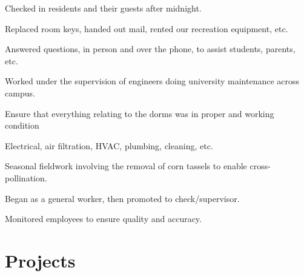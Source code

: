 \documentclass[]{latex/resume}
\begin{document}
\begin{minipage}[t]{0.75\textwidth}
    \sectionsep

     
    \begin{tightemize}
        \sectionsep
            \item Checked in residents and their guests after midnight.
            \item Replaced room keys, handed out mail, rented our recreation equipment, etc.
            \item Answered questions, in person and over the phone, to assist students, parents, etc.
        \end{tightemize}

    \sectionsep

         
        \begin{tightemize}
            \sectionsep
                \item Worked under the supervision of engineers doing university maintenance across campus.
                \item Ensure that everything relating to the dorms was in proper and working condition
                \item Electrical, air filtration, HVAC, plumbing, cleaning, etc.
            \end{tightemize}
            
    \sectionsep

     
    \begin{tightemize}
        \sectionsep
            \item Seasonal fieldwork involving the removal of corn tassels to enable cross-pollination.
            \item Began as a general worker, then promoted to check/supervisor.
            \item Monitored employees to ensure quality and accuracy.
    \end{tightemize}
    



\section{Projects}


\end{minipage}
\end{document}
